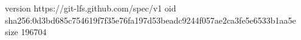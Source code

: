 version https://git-lfs.github.com/spec/v1
oid sha256:0d3bd685c754619f7f35e76fa197d53beadc9244f057ae2ca3fe5e6533b1aa5e
size 196704

